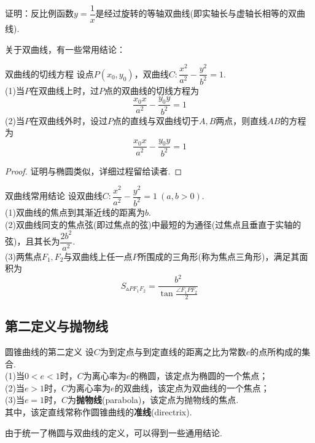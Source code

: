 \documentclass[lang=cn, zihao=5]{elegantbook}
\begin{document}
\begin{example}
	证明：反比例函数$y=\dfrac{1}{x}$是经过旋转的等轴双曲线(即实轴长与虚轴长相等的双曲线).
\end{example}

关于双曲线，有一些常用结论：

\begin{proposition}{双曲线的切线方程}
	设点$P(x_0,y_0)$，双曲线$C:\dfrac{x^2}{a^2}-\dfrac{y^2}{b^2}=1$. \\
	(1)当$P$在双曲线上时，过$P$点的双曲线的切线方程为$$\frac{x_0x}{a^2} - \frac{y_0y}{b^2} = 1$$
	(2)当$P$在双曲线外时，设过$P$点的直线与双曲线切于$A,B$两点，则直线$AB$的方程为$$\frac{x_0x}{a^2} - \frac{y_0y}{b^2} = 1$$
\end{proposition}
\begin{proof}
	证明与椭圆类似，详细过程留给读者.
\end{proof}

\begin{proposition}{双曲线常用结论}
	设双曲线$C:\dfrac{x^2}{a^2}-\dfrac{y^2}{b^2}=1~(a,b>0)$. \\
	(1)双曲线的焦点到其渐近线的距离为$b$. \\
	(2)双曲线同支的焦点弦(即过焦点的弦)中最短的为通径(过焦点且垂直于实轴的弦)，且其长为$\dfrac{2b^2}{a^2}$. \\
	(3)两焦点$F_1,F_2$与双曲线上任一点$P$所围成的三角形(称为焦点三角形)，满足其面积为$$S_{\vartriangle PF_1F_2} = \frac{b^2}{\tan \frac{\angle F_1PF_2}{2}}$$
\end{proposition}

\subsection{第二定义与抛物线}

\begin{definition}{圆锥曲线的第二定义}
	设$C$为到定点与到定直线的距离之比为常数$e$的点所构成的集合. \\
	(1)当$0<e<1$时，$C$为离心率为$e$的椭圆，该定点为椭圆的一个焦点； \\
	(2)当$e>1$时，$C$为离心率为$e$的双曲线，该定点为双曲线的一个焦点； \\
	(3)当$e=1$时，$C$为\textbf{抛物线}(parabola)，该定点为抛物线的焦点. \\
	其中，该定直线常称作圆锥曲线的\textbf{准线}(directrix).
\end{definition}

由于统一了椭圆与双曲线的定义，可以得到一些通用结论.
\end{document}

